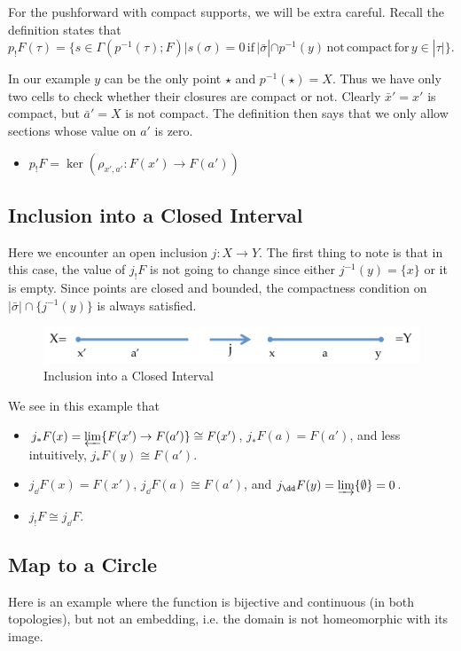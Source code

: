 For the pushforward with compact supports, we will be extra careful. Recall the definition states that $p_!F(\tau)=\{s\in\Gamma(p^{-1}(\tau);F)|s(\sigma)=0\, \mathrm{if}\, |\bar{\sigma}|\cap p^{-1}(y)\,\mathrm{not}\,\mathrm{compact}\,\mathrm{for}\, y\in|\tau|\}$.

In our example $y$ can be the only point $\star$ and $p^{-1}(\star)=X$. Thus we have only two cells to check whether their closures are compact or not. Clearly $\bar{x}'=x'$ is compact, but $\bar{a}'=X$ is not compact. The definition then says that we only allow sections whose value on $a'$ is zero.
\begin{itemize}
 \item $p_!F=\ker (\rho_{x',a'}:F(x')\to F(a'))$
\end{itemize}


\subsection{Inclusion into a Closed Interval}
Here we encounter an open inclusion $j:X\to Y$. The first thing to note is that in this case, the value of $j_!F$ is not going to change since either $j^{-1}(y)=\{x\}$ or it is empty. Since points are closed and bounded, the compactness condition on $|\bar{\sigma}|\cap \{j^{-1}(y)\}$ is always satisfied.

\begin{figure}[!ht]
\centering
\includegraphics[width=\textwidth]{shv_fun_ex2p.pdf}
\caption{Inclusion into a Closed Interval}
\label{fig:shv_fun_ex2}
\end{figure}

We see in this example that
\begin{itemize}
 \item $j_*F(x)=\varprojlim\{F(x')\to F(a')\}\cong F(x')$, $j_*F(a)=F(a')$, and less intuitively, $j_*F(y)\cong F(a')$.
 \item $j_{\dd}F(x)= F(x')$, $j_{\dd}F(a)\cong F(a')$, and $j_{\dd}F(y)=\varinjlim\{\emptyset\}=0$.
 \item $j_!F\cong j_{\dd}F$.
\end{itemize}


\subsection{Map to a Circle}
Here is an example where the function is bijective and continuous (in both topologies), but not an embedding, i.e. the domain is not homeomorphic with its image.

